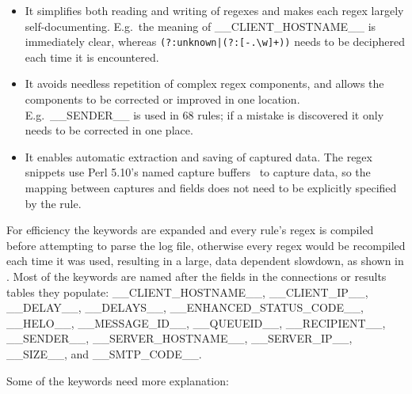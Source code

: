 \begin{itemize}

    \item It simplifies both reading and writing of regexes and makes each
        regex largely self-documenting.  E.g.\ the meaning of
        \_\_CLIENT\_HOSTNAME\_\_ is immediately clear, whereas
        \verb!(?:unknown|(?:[-.\w]+))! needs to be deciphered each time it
        is encountered.

    \item It avoids needless repetition of complex regex components, and
        allows the components to be corrected or improved in one location.
        E.g.\ \_\_SENDER\_\_ is used in 68 rules; if a mistake is
        discovered it only needs to be corrected in one place.

    \item It enables automatic extraction and saving of captured data.  The
        regex snippets use Perl 5.10's named capture buffers~\cite{perlre}
        to capture data, so the mapping between captures and fields does
        not need to be explicitly specified by the rule.

\end{itemize}

For efficiency the keywords are expanded and every rule's regex is compiled
before attempting to parse the log file, otherwise every regex would be
recompiled each time it was used, resulting in a large, data dependent
slowdown, as shown in .  Most of the
keywords are named after the fields in the connections or results tables
they populate: \_\_CLIENT\_HOSTNAME\_\_, \_\_CLIENT\_IP\_\_, \_\_DELAY\_\_,
\_\_DELAYS\_\_, \_\_ENHANCED\_STATUS\_CODE\_\_, \_\_HELO\_\_,
\_\_MESSAGE\_ID\_\_, \_\_QUEUEID\_\_, \_\_RECIPIENT\_\_, \_\_SENDER\_\_,
\_\_SERVER\_HOSTNAME\_\_, \_\_SERVER\_IP\_\_, \_\_SIZE\_\_, and
\_\_SMTP\_CODE\_\_.

Some of the keywords need more explanation:

